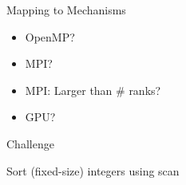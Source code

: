 \documentclass[english,compress]{beamer}
\begin{document}
\begin{frame}{Mapping to Mechanisms}
  \begin{itemize}[<+->]
    \item OpenMP?
    \item MPI?
    \item MPI: Larger than \# ranks?
    \item GPU?
  \end{itemize}
\end{frame}
\begin{frame}{Challenge}
  \begin{center}
    \Huge Sort (fixed-size) integers using scan
  \end{center}
\end{frame}
\end{document}
